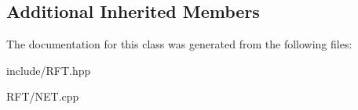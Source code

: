 \subsection*{Additional Inherited Members}


The documentation for this class was generated from the following files\+:\begin{DoxyCompactItemize}
\item 
include/R\+F\+T.\+hpp\item 
R\+F\+T/N\+E\+T.\+cpp\end{DoxyCompactItemize}
